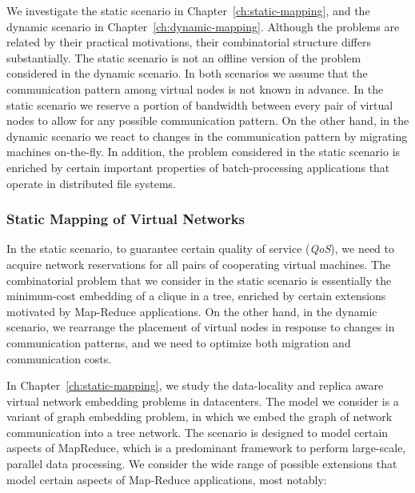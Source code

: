We investigate the static scenario in Chapter~\ref{ch:static-mapping}, and the dynamic scenario in Chapter~\ref{ch:dynamic-mapping}.
Although the problems are related by their practical motivations, their combinatorial structure differs substantially.
The static scenario is not an offline version of the problem considered in the dynamic scenario.
In both scenarios we assume that the communication pattern among virtual nodes is not known in advance.
In the static scenario we reserve a portion of bandwidth between every pair of virtual nodes to allow for any possible communication pattern.
On the other hand, in the dynamic scenario we react to changes in the communication pattern by migrating machines on-the-fly.
In addition, the problem considered in the static scenario is enriched by certain important properties of batch-processing applications that operate in distributed file systems.


\subsubsection{Static Mapping of Virtual Networks}
\label{sec:contributions-static-mapping}

In the static scenario, to guarantee certain quality of service (\emph{QoS}), we need to acquire network reservations for all pairs of cooperating virtual machines.
The combinatorial problem that we consider in the static scenario is essentially the minimum-cost embedding of a clique in a tree, enriched by certain extensions motivated by Map-Reduce \cite{mapreduce}  applications.
On the other hand, in the dynamic scenario, we rearrange the placement of virtual nodes in response to changes in communication patterns, and we need to optimize both migration and communication costs.

In Chapter~\ref{ch:static-mapping}, we study the data-locality and replica aware virtual network embedding problems in datacenters.
The model we consider is a variant of graph embedding problem, in which we embed the graph of network communication into a tree network.
The scenario is designed to model certain aspects of MapReduce, which is a predominant framework to perform large-scale, parallel data processing.
We consider the wide range of possible extensions that model certain aspects of Map-Reduce applications, most notably:

